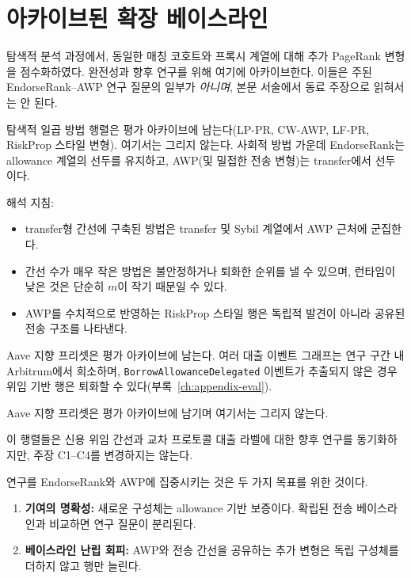 \section{아카이브된 확장 베이스라인}
\label{ch:appendix-archive}

탐색적 분석 과정에서, 동일한 매칭 코호트와 프록시 계열에 대해 추가 PageRank 변형을 점수화하였다. 완전성과 향후 연구를 위해 여기에 아카이브한다. 이들은 주된 EndorseRank--AWP 연구 질문의 일부가 \emph{아니며}, 본문 서술에서 동료 주장으로 읽혀서는 안 된다.


탐색적 일곱 방법 행렬은 평가 아카이브에 남는다(LP-PR, CW-AWP, LF-PR, RiskProp 스타일 변형). 여기서는 그리지 않는다. 사회적 방법 가운데 EndorseRank는 allowance 계열의 선두를 유지하고, AWP(및 밀접한 전송 변형)는 transfer에서 선두이다.

해석 지침:

\begin{itemize}
\item transfer형 간선에 구축된 방법은 transfer 및 Sybil 계열에서 AWP 근처에 군집한다.
\item 간선 수가 매우 작은 방법은 불안정하거나 퇴화한 순위를 낼 수 있으며, 런타임이 낮은 것은 단순히 $m$이 작기 때문일 수 있다.
\item AWP를 수치적으로 반영하는 RiskProp 스타일 행은 독립적 발견이 아니라 공유된 전송 구조를 나타낸다.
\end{itemize}


Aave 지향 프리셋은 평가 아카이브에 남는다. 여러 대출 이벤트 그래프는 연구 구간 내 Arbitrum에서 희소하며, \texttt{BorrowAllowanceDelegated} 이벤트가 추출되지 않은 경우 위임 기반 행은 퇴화할 수 있다(부록~\ref{ch:appendix-eval}).

Aave 지향 프리셋은 평가 아카이브에 남기며 여기서는 그리지 않는다.

이 행렬들은 신용 위임 간선과 교차 프로토콜 대출 라벨에 대한 향후 연구를 동기화하지만, 주장 C1--C4를 변경하지는 않는다.


연구를 EndorseRank와 AWP에 집중시키는 것은 두 가지 목표를 위한 것이다.

\begin{enumerate}
\item \textbf{기여의 명확성:} 새로운 구성체는 allowance 기반 보증이다. 확립된 전송 베이스라인과 비교하면 연구 질문이 분리된다.
\item \textbf{베이스라인 난립 회피:} AWP와 전송 간선을 공유하는 추가 변형은 독립 구성체를 더하지 않고 행만 늘린다.
\end{enumerate}

